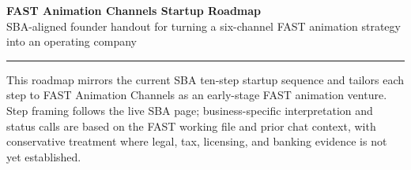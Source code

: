 \documentclass[10pt]{article}
\begin{document}
\small

{\LARGE\bfseries FAST Animation Channels Startup Roadmap}\\[-1pt]
{\normalsize SBA-aligned founder handout for turning a six-channel FAST animation strategy into an operating company}

\vspace{6pt}
\hrule
\vspace{6pt}

This roadmap mirrors the current SBA ten-step startup sequence and tailors each step to FAST Animation Channels as an early-stage FAST animation venture. Step framing follows the live SBA page; business-specific interpretation and status calls are based on the FAST working file and prior chat context, with conservative treatment where legal, tax, licensing, and banking evidence is not yet established.

\setlength{\LTpre}{6pt}
\setlength{\LTpost}{6pt}
\renewcommand{\arraystretch}{1.14}
\setlength{\tabcolsep}{3pt}
\footnotesize
\end{document}
